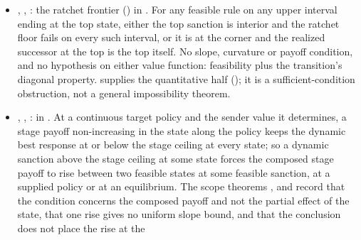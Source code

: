 \begin{itemize}[leftmargin=1.4em,itemsep=1pt]
, and
:
The parametric comparative-statics results behind
.  The older fixed-point results order
extremal basin steady states.  The new general-$F$ path results separately
show that, under a shared transition and a monotone upper rule, a pointwise
ordering of the rules orders every realized-path iterate and hence the convergent
selected limits.  The patience specialization holds continuation value
and target policy fixed, matching the direct-effect scope stated in the
text.  The affine adjustment-weight theorem is only a weak comparison:
for positive weights the fixed-point set is invariant, and the theorem
may bind with equality.  It is not a general-$F$ selected-limit theorem.
\item {}, ,
: the ratchet frontier
() in
.  For any
feasible rule on any upper interval ending at the top state, either the top
sanction is interior and the ratchet floor fails on every such interval, or it
is at the corner and the realized successor at the top is the top itself.  No
slope, curvature or payoff condition, and no hypothesis on either value
function: feasibility plus the transition's diagonal property.
 supplies the quantitative half
(); it is a sufficient-condition obstruction,
not a general impossibility theorem.
\item {}, ,
:  in
.  At a continuous target policy
and the sender value it determines, a stage payoff non-increasing in the state
along the policy keeps the dynamic best response at or below the
stage ceiling at every state; so a dynamic sanction above the stage ceiling at
some state forces the composed stage payoff to rise between two feasible states
at some feasible sanction, at a supplied policy or at an equilibrium.  The
scope theorems ,
 and
 record that the condition concerns
the composed payoff and not the partial effect of the state, that one rise
gives no uniform slope bound, and that the conclusion does not place the rise at the

\end{itemize}
